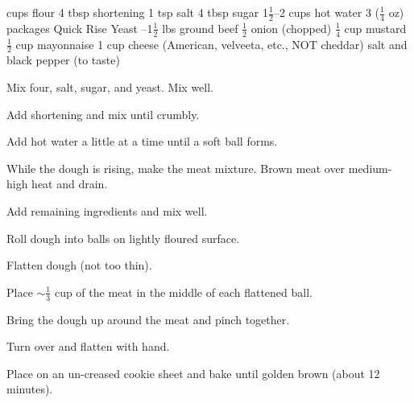\dishtype{\main}
\begin{ingreds}
     cups flour
        4 tbsp shortening
        1 tsp salt
        4 tbsp sugar       
        1$\frac{1}{2}$--2 cups hot water
        3 ($\frac{1}{4}$ oz) packages Quick Rise Yeast 
    \columnbreak{}
    --1$\frac{1}{2}$ lbs ground beef
        $\frac{1}{2}$ onion (chopped)
        $\frac{1}{4}$ cup mustard
        $\frac{1}{2}$ cup mayonnaise
        1 cup cheese (American, velveeta, etc., NOT cheddar)
        salt and black pepper (to taste)
\end{ingreds}
\begin{method}
        Mix four, salt, sugar, and yeast. Mix well.\par
        Add shortening and mix until crumbly.\par
        Add hot water a little at a time until a soft ball forms.\par
        While the dough is rising, make the meat mixture.
        Brown meat over medium-high heat and drain.\par
        Add remaining ingredients and mix well.\par
        Roll dough into balls on lightly floured surface.\par
        Flatten dough (not too thin).\par
        Place $\sim\frac{1}{3}$ cup of the meat in the middle of each flattened ball.\par
        Bring the dough up around the meat and pinch together.\par
        Turn over and flatten with hand.\par
        Place on an un-creased cookie sheet and bake until golden brown (about 12 minutes).
\end{method}